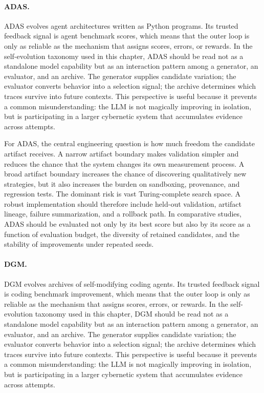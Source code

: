 \paragraph{ADAS.} ADAS evolves agent architectures written as Python programs.  Its trusted feedback signal is agent benchmark scores, which means that the outer loop is only as reliable as the mechanism that assigns scores, errors, or rewards.  In the self-evolution taxonomy used in this chapter, ADAS should be read not as a standalone model capability but as an interaction pattern among a generator, an evaluator, and an archive.  The generator supplies candidate variation; the evaluator converts behavior into a selection signal; the archive determines which traces survive into future contexts.  This perspective is useful because it prevents a common misunderstanding: the LLM is not magically improving in isolation, but is participating in a larger cybernetic system that accumulates evidence across attempts.

For ADAS, the central engineering question is how much freedom the candidate artifact receives.  A narrow artifact boundary makes validation simpler and reduces the chance that the system changes its own measurement process.  A broad artifact boundary increases the chance of discovering qualitatively new strategies, but it also increases the burden on sandboxing, provenance, and regression tests.  The dominant risk is vast Turing-complete search space.  A robust implementation should therefore include held-out validation, artifact lineage, failure summarization, and a rollback path.  In comparative studies, ADAS should be evaluated not only by its best score but also by its score as a function of evaluation budget, the diversity of retained candidates, and the stability of improvements under repeated seeds.

\paragraph{DGM.} DGM evolves archives of self-modifying coding agents.  Its trusted feedback signal is coding benchmark improvement, which means that the outer loop is only as reliable as the mechanism that assigns scores, errors, or rewards.  In the self-evolution taxonomy used in this chapter, DGM should be read not as a standalone model capability but as an interaction pattern among a generator, an evaluator, and an archive.  The generator supplies candidate variation; the evaluator converts behavior into a selection signal; the archive determines which traces survive into future contexts.  This perspective is useful because it prevents a common misunderstanding: the LLM is not magically improving in isolation, but is participating in a larger cybernetic system that accumulates evidence across attempts.

